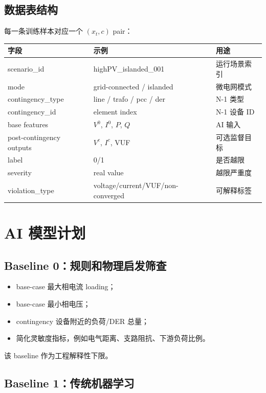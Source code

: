 \documentclass[UTF8,11pt]{ctexart}
\begin{document}
\subsection{数据表结构}

每一条训练样本对应一个 $(x_t,c)$ pair：

\begin{center}
\begin{tabular}{lll}
\toprule
字段 & 示例 & 用途 \\
\midrule
scenario\_id & highPV\_islanded\_001 & 运行场景索引 \\
mode & grid-connected / islanded & 微电网模式 \\
contingency\_type & line / trafo / pcc / der & N-1 类型 \\
contingency\_id & element index & N-1 设备 ID \\
base features & $V^0$, $I^0$, $P$, $Q$ & AI 输入 \\
post-contingency outputs & $V^c$, $I^c$, VUF & 可选监督目标 \\
label & 0/1 & 是否越限 \\
severity & real value & 越限严重度 \\
violation\_type & voltage/current/VUF/non-converged & 可解释标签 \\
\bottomrule
\end{tabular}
\end{center}

\section{AI 模型计划}

\subsection{Baseline 0：规则和物理启发筛查}

\begin{itemize}
    \item base-case 最大相电流 loading；
    \item base-case 最小相电压；
    \item contingency 设备附近的负荷/DER 总量；
    \item 简化灵敏度指标，例如电气距离、支路阻抗、下游负荷比例。
\end{itemize}

该 baseline 作为工程解释性下限。

\subsection{Baseline 1：传统机器学习}
\end{document}
